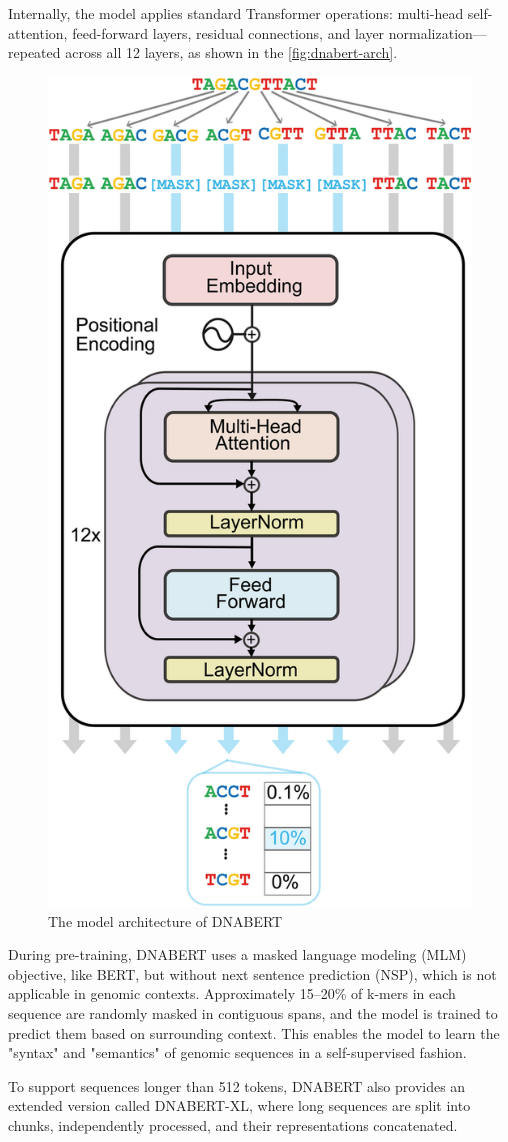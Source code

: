 Internally, the model applies standard Transformer operations: multi-head self-attention, feed-forward layers, residual connections, and layer normalization—repeated across all 12 layers, as shown in the \autoref{fig:dnabert-arch}.

\begin{figure}[h!]
    \centering
    \includegraphics[width=.6\linewidth]{imgs/model-arch.png}
    \caption{The model architecture of DNABERT \cite{384017589}}
    \label{fig:dnabert-arch}
\end{figure}

During pre-training, DNABERT uses a masked language modeling (MLM) objective, like BERT, but without next sentence prediction (NSP), which is not applicable in genomic contexts. Approximately 15–20\% of k-mers in each sequence are randomly masked in contiguous spans, and the model is trained to predict them based on surrounding context. This enables the model to learn the "syntax" and "semantics" of genomic sequences in a self-supervised fashion.

To support sequences longer than 512 tokens, DNABERT also provides an extended version called DNABERT-XL, where long sequences are split into chunks, independently processed, and their representations concatenated.

